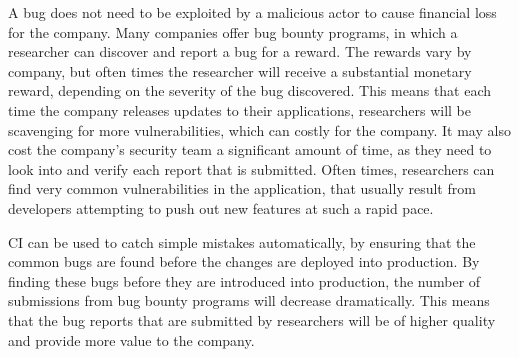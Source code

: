 	A bug does not need to be exploited by a malicious actor to cause financial loss for the company. Many companies offer bug bounty programs, in which a researcher can discover and report a bug 
    for a reward. The rewards vary by company, but often times the researcher will receive a substantial monetary reward, depending on the severity of the bug discovered. This means that each time 
    the company releases updates to their applications, researchers will be scavenging for more vulnerabilities, which can costly for the company. It may also cost the company's security team a 
    significant amount of time, as they need to look into and verify each report that is submitted. Often times, researchers can find very common vulnerabilities in the application, that usually 
    result from developers attempting to push out new features at such a rapid pace.

	CI can be used to catch simple mistakes automatically, by ensuring that the common bugs are found before the changes are deployed into production. By finding these bugs before they are introduced 
    into production, the number of submissions from bug bounty programs will decrease dramatically. This means that the bug reports that are submitted by researchers will be of higher quality and 
    provide more value to the company.


